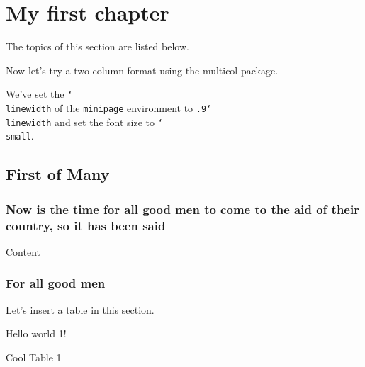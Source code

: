 \documentclass{book}
\newcommand{\insMinitoc}[2][]{%
    \begin{center}#2
    \begin{minipage}[c]{0.8\linewidth}
    \insertminitoc[#1]
    \end{minipage}
    \end{center}
}
\newcommand{\insMinitociiCols}[2][]{%
    \begin{center}#2
    \begin{minipage}[c]{.9\linewidth}
\begin{multicols}{2}
    \insertminitoc[#1]
\end{multicols}
    \end{minipage}
    \end{center}
}
\let\env\texttt
\let\pkg\textsf
\def\cs#1{\texttt{\char`\\#1}}
\begin{document}
\tableofcontents

\listoffigures

\listoftables

\newpage

\chapter{My first chapter}

The topics of this section are listed below.

\insMinitoc{\small\minitocFmtColor}

Now let's try a two column format using the \pkg{multicol} package.

\insMinitociiCols{\small\minitocFmtColoriiCols}

\noindent We've set the \cs{linewidth} of the \env{minipage} environment to
\texttt{.9\cs{linewidth}} and set the font size to \cs{small}.


\section{First of Many}

\subsection[\protect\miniorfulltoc{\textbf}{Now is the time for all good men to come to the aid of their country, so it has been said}]{Now is the time for all good men to come to the aid of their country, so it has been said}

Content


\subsection{For all good men}

Let's insert a table in this section.

\begin{table}[htb]
\begin{center}
Hello world 1!
\end{center}
\caption{Cool Table 1}
\end{table}
\end{document}
